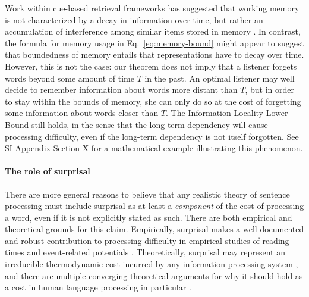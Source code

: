 Work within cue-based retrieval frameworks has suggested that working memory is not characterized by a decay in information over time, but rather an accumulation of interference among similar items stored in memory \citep[][p. 408]{lewis-activation-based-2005}.
In contrast, the formula for memory usage in Eq.~\ref{eq:memory-bound} might appear to suggest that boundedness of memory entails that representations have to decay over time.
However, this is not the case:
our theorem does not imply that a listener forgets words beyond some amount of time $T$ in the past. 
An optimal listener may well decide to remember information about words more distant than $T$, but in order to stay within the bounds of memory, she can only do so at the cost of forgetting some information about words closer than $T$.
The Information Locality Lower Bound still holds, in the sense that the long-term dependency will cause processing difficulty, even if the long-term dependency is not itself forgotten.
See SI Appendix Section X for a mathematical example illustrating this phenomenon.


\paragraph{The role of surprisal}

There are more general reasons to believe that any realistic theory of sentence processing must include surprisal as at least a \emph{component} of the cost of processing a word, even if it is not explicitly stated as such. 
There are both empirical and theoretical grounds for this claim.
Empirically, surprisal makes a well-documented and robust contribution to processing difficulty in empirical studies of reading times and event-related potentials \citep{smith2013effect,frank2016erp}. 
Theoretically, surprisal may represent an irreducible thermodynamic cost incurred by any information processing system \citep{landauer,still2012thermodynamic,zenon2019information}, and there are multiple converging theoretical arguments for why it should hold as a cost in human language processing in particular \cite[see][for a review]{levy2013memory}. 




